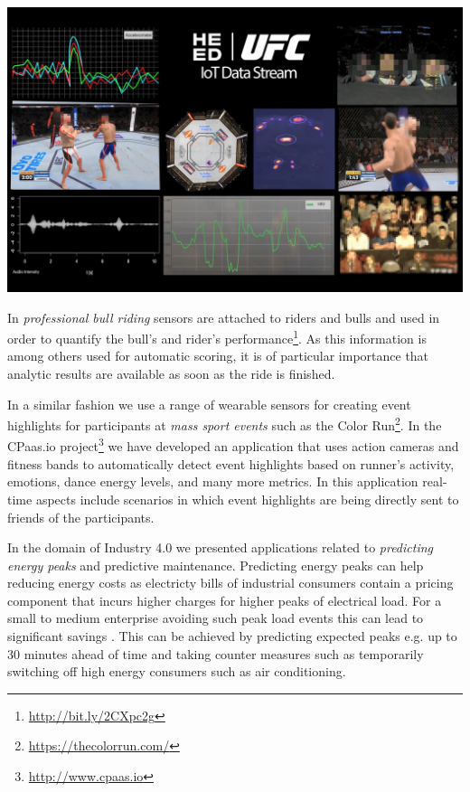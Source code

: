 \begin{center}
\includegraphics[scale=0.15]{pictures/DP6L8S9XkAYFMCw.jpg}
\end{center}

In \emph{professional bull riding} sensors are attached to riders and bulls and used in order to quantify the bull's and rider's performance\footnote{\url{http://bit.ly/2CXpc2g}}. As this information is among others used for automatic scoring, it is of particular importance that analytic results are available as soon as the ride is finished. 

In a similar fashion we use a range of wearable sensors for creating event highlights for participants at \emph{mass sport events} such as the Color Run\footnote{\url{https://thecolorrun.com/}}. In the CPaas.io project\footnote{\url{http://www.cpaas.io}} we have developed an application that uses action cameras and fitness bands to automatically detect event highlights based on runner's activity, emotions, dance energy levels, and many more metrics. In this application real-time aspects include scenarios in which event highlights are being directly sent to friends of the participants. 

In the domain of Industry 4.0 we presented applications related to \emph{predicting energy peaks} and predictive maintenance. Predicting energy peaks can help reducing energy costs as electricty bills of industrial consumers contain a pricing component that incurs higher charges for higher peaks of electrical load. For a small to medium enterprise avoiding such peak load events this can lead to significant savings \cite{strohbach_and_toll_2016}. This can be achieved by predicting expected peaks e.g. up to 30 minutes ahead of time and taking counter measures such as temporarily switching off high energy consumers such as air conditioning. 

